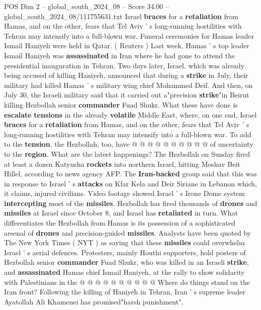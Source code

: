 \begin{textsample}{POS Dim 2 – global\_south\_2024\_08 – Score 34.00 – global\_south\_2024\_08/111755631.txt}  \label{ex:f2_pos_003}
Israel \textbf{braces} for a \textbf{retaliation} from Hamas, and on the other, fears that Tel Aviv ' s long-running hostilities with Tehran may intensify into a full-blown war.
Funeral ceremonies for Hamas leader Ismail Haniyeh were held in Qatar. ( Reuters ) Last week, Hamas ' s top leader Ismail Haniyeh was \textbf{assassinated} in Iran where he had gone to attend the presidential inauguration in Tehran.
Two days later, Israel, which was already being accused of killing Haniyeh, announced that during a \textbf{strike} in July, their military had killed Hamas ' s military wing chief Mohammed Deif.
And then, on July 30, the Israeli military said that it carried out a"precision \textbf{strike}"in Beirut killing Hezbollah senior \textbf{commander} Fuad Shukr.
What these have done is \textbf{escalate} \textbf{tensions} in the already \textbf{volatile} Middle East, where, on one end, Israel \textbf{braces} for a \textbf{retaliation} from Hamas, and on the other, fears that Tel Aviv ' s long-running hostilities with Tehran may intensify into a full-blown war.
To add to the \textbf{tension}, the Hezbollah, too, have @ @ @ @ @ @ @ @ @ @ of uncertainty to the \textbf{region}.
What are the latest happenings?
The Hezbollah on Sunday fired at least a dozen Katyusha \textbf{rockets} into northern Israel, hitting Moshav Beit Hillel, according to news agency AFP.
The \textbf{Iran-backed} group said that this was in response to Israel ' s \textbf{attacks} on Kfar Kela and Deir Siriane in Lebanon which, it claims, injured civilians.
Video footage showed Israel ' s Irone Dome system \textbf{intercepting} most of the \textbf{missiles}.
Hezbollah has fired thousands of \textbf{drones} and \textbf{missiles} at Israel since October 8, and Israel has \textbf{retaliated} in turn.
What differentiates the Hezbollah from Hamas is its possession of a sophisticated arsenal of \textbf{drones} and precision-guided \textbf{missiles}.
Analysts have been quoted by The New York Times ( NYT ) as saying that these \textbf{missiles} could overwhelm Israel ' s aerial defences.
Protesters, mainly Houthi supporters, hold posters of Hezbollah senior \textbf{commander} Fuad Shukr, who was killed in an Israeli \textbf{strike}, and \textbf{assassinated} Hamas chief Ismail Haniyeh, at the rally to show solidarity with Palestinians in the @ @ @ @ @ @ @ @ @ @ Where do things stand on the Iran front?
Following the killing of Haniyeh in Tehran, Iran ' s supreme leader Ayatollah Ali Khamenei has promised"harsh punishment".

\end{textsample}
